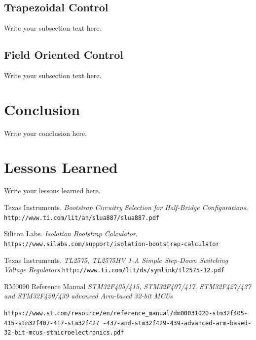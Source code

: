 \documentclass{article}
\begin{document}
	
		\subsection{Trapezoidal Control}
		Write your subsection text here.
		
		\subsection{Field Oriented Control}
		Write your subsection text here.
	
	\section{Conclusion}
	Write your conclusion here.
	
	\section{Lessons Learned}
	Write your lessons learned here.
	
	
	
	
	\begin{thebibliography}{9}
		Texas Instruments.
		\textit{Bootstrap Circuitry Selection for Half-Bridge Configurations}.
		\\\texttt{http://www.ti.com/lit/an/slua887/slua887.pdf}
		
		Silicon Labs. 
		\textit{Isolation Bootstrap Calculator}. 
		\\\texttt{https://www.silabs.com/support/isolation-bootstrap-calculator}
		
		Texas Instruments.
		\textit{TL2575, TL2575HV 1-A Simple Step-Down Switching Voltage Regulators}
		\texttt{http://www.ti.com/lit/ds/symlink/tl2575-12.pdf}
		
		
		RM0090 Reference Manual
		\textit{STM32F405/415, STM32F407/417, STM32F427/437 and STM32F429/439 advanced Arm-based 32-bit MCUs}
		
		\texttt{https://www.st.com/resource/en/reference\_manual/dm00031020-stm32f405-415-stm32f407-417-stm32f427
-437-and-stm32f429-439-advanced-arm-based-32-bit-mcus-stmicroelectronics.pdf}
		
		
	\end{thebibliography}
	
	
	
\end{document}
